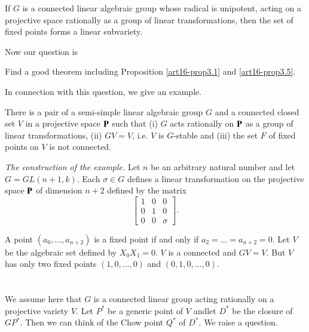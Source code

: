 \begin{proposition}\label{art16-prop3.5}
If $G$ is a connected linear algebraic group whose radical is unipotent, acting on a projective space rationally as a group of linear transformations, then the set of fixed points forms a linear subvariety.
\end{proposition}

Now our question is

\begin{question}\label{art16-ques3.6}
Find a good theorem including Proposition \ref{art16-prop3.1} and \ref{art16-prop3.5}.
\end{question}

In connection with this question, we give an example.

\begin{example}\label{art16-exam3.7}
There is a pair of a semi-simple linear algebraic group $G$ and a connected closed set $V$ in a projective space $\mathbf{P}$ such that (i) $G$ acts rationally on $\mathbf{P}$ as a group of linear transformations, (ii) $GV=V$, i.e. $V$ is $G$-stable and (iii) the set $F$ of fixed points on $V$ is not connected.
\end{example}

{\em The construction of the example.} Let $n$ be an arbitrary natural number and let $G=GL(n+1,k)$. Each $\sigma\in G$ defines a linear transformation on the projective space $\mathbf{P}$ of dimension $n+2$ defined by the matrix
$$
\begin{bmatrix}
1 & 0 & 0\\
0 & 1 & 0\\
0 & 0 & \sigma
\end{bmatrix}.
$$  

A point $(a_{0},\ldots,a_{n+2})$ is a fixed point if and only if $a_{2}=\ldots=a_{n+2}=0$. Let $V$ be the algebraic set defined by $X_{0}X_{1}=0$. $V$ is a connected and $GV=V$. But $V$ has only two fixed points $(1,0,\ldots,0)$ and $(0,1,0,\ldots,0)$.

\medskip

\section{}\label{art16-sec4}
We assume here that $G$ is a connected linear group acting rationally on a projective variety $V$. Let $P^{*}$ be a generic point of $V$ and\pageoriginale let $D^{*}$ be the closure of $GP^{*}$. Then we can think of the Chow point $Q^{*}$ of $D^{*}$. We raise a question.

